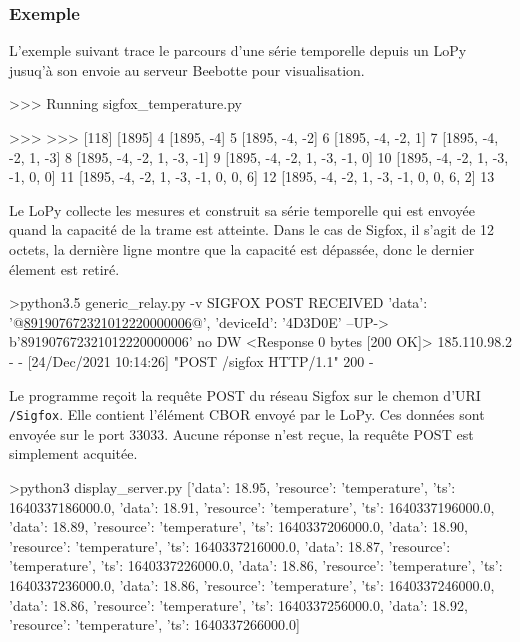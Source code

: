  \subsubsection{Exemple}
 
L'exemple suivant trace le parcours d'une série temporelle depuis un LoPy jusuq'à son envoie au serveur Beebotte pour visualisation.

\begin{termc}[backgroundcolor=\color{gray!10}, basicstyle=\ttfamily\small, escapechar=@] 
>>> Running sigfox_temperature.py

>>>
>>>
[118]
[1895] 4
[1895, -4] 5
[1895, -4, -2] 6
[1895, -4, -2, 1] 7
[1895, -4, -2, 1, -3] 8
[1895, -4, -2, 1, -3, -1] 9
[1895, -4, -2, 1, -3, -1, 0] 10
[1895, -4, -2, 1, -3, -1, 0, 0] 11
[1895, -4, -2, 1, -3, -1, 0, 0, 6] 12
[1895, -4, -2, 1, -3, -1, 0, 0, 6, 2] 13
\end{termc}

Le LoPy collecte les mesures et construit sa série temporelle qui est envoyée quand la capacité de la trame est atteinte. Dans le cas de Sigfox, il s'agit de 12 octets, la dernière ligne montre que la capacité est dépassée, donc le dernier élement est retiré.

\begin{termc}[backgroundcolor=\color{palerod}, basicstyle=\ttfamily\small, escapechar=@] 
 >python3.5 generic_relay.py -v
SIGFOX POST RECEIVED
{'data': '@\ul{891907672321012220000006}@', 'deviceId': '4D3D0E'}
--UP-> b'891907672321012220000006'
no DW
<Response 0 bytes [200 OK]>
185.110.98.2 - - [24/Dec/2021 10:14:26] "POST /sigfox HTTP/1.1" 200 -
\end{termc}

Le programme  reçoit la requête POST du réseau Sigfox sur le chemon d'URI \texttt{/Sigfox}. Elle contient l'élément CBOR envoyé par le LoPy. Ces données sont envoyée sur le port 33033. Aucune réponse n'est reçue, la requête POST est simplement acquitée.


\begin{termc}[backgroundcolor=\color{palerod}, basicstyle=\ttfamily\small, escapechar=@] 
 >python3 display_server.py
[{'data': 18.95, 'resource': 'temperature', 'ts': 1640337186000.0},
 {'data': 18.91, 'resource': 'temperature', 'ts': 1640337196000.0},
 {'data': 18.89, 'resource': 'temperature', 'ts': 1640337206000.0},
 {'data': 18.90, 'resource': 'temperature', 'ts': 1640337216000.0},
 {'data': 18.87, 'resource': 'temperature', 'ts': 1640337226000.0},
 {'data': 18.86, 'resource': 'temperature', 'ts': 1640337236000.0},
 {'data': 18.86, 'resource': 'temperature', 'ts': 1640337246000.0},
 {'data': 18.86, 'resource': 'temperature', 'ts': 1640337256000.0},
 {'data': 18.92, 'resource': 'temperature', 'ts': 1640337266000.0}]
\end{termc}

